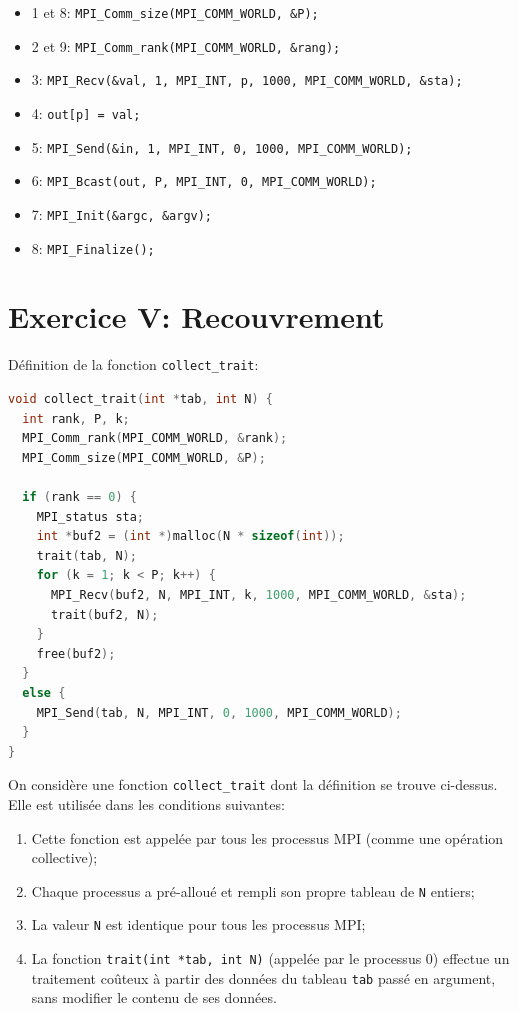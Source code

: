 \documentclass{article}
\begin{document}
\begin{itemize}
\item 1 et 8: \texttt{MPI\_Comm\_size(MPI\_COMM\_WORLD, \&P);}
\item 2 et 9: \texttt{MPI\_Comm\_rank(MPI\_COMM\_WORLD, \&rang);}
\item 3: \texttt{MPI\_Recv(\&val, 1, MPI\_INT, p, 1000, MPI\_COMM\_WORLD, \&sta);}
\item 4: \texttt{out[p] = val;}
\item 5: \texttt{MPI\_Send(\&in, 1, MPI\_INT, 0, 1000, MPI\_COMM\_WORLD);}
\item 6: \texttt{MPI\_Bcast(out, P, MPI\_INT, 0, MPI\_COMM\_WORLD);}
\item 7: \texttt{MPI\_Init(\&argc, \&argv);}
\item 8: \texttt{MPI\_Finalize();}
\end{itemize}

\newpage\section{Exercice V: Recouvrement}


\begin{blockquote}

Définition de la fonction \texttt{collect\_trait}:

\begin{lstlisting}[language=c]
void collect_trait(int *tab, int N) {
  int rank, P, k;
  MPI_Comm_rank(MPI_COMM_WORLD, &rank);
  MPI_Comm_size(MPI_COMM_WORLD, &P);

  if (rank == 0) {
    MPI_status sta;
    int *buf2 = (int *)malloc(N * sizeof(int));
    trait(tab, N);
    for (k = 1; k < P; k++) {
      MPI_Recv(buf2, N, MPI_INT, k, 1000, MPI_COMM_WORLD, &sta);
      trait(buf2, N);
    }
    free(buf2);
  }
  else {
    MPI_Send(tab, N, MPI_INT, 0, 1000, MPI_COMM_WORLD);
  }
}
\end{lstlisting}

On considère une fonction \texttt{collect\_trait} dont la définition se trouve ci-dessus. Elle est utilisée dans les conditions suivantes:

\begin{enumerate}
\item Cette fonction est appelée par tous les processus MPI (comme une opération collective);

\item Chaque processus a pré-alloué et rempli son propre tableau de \texttt{N} entiers;

\item La valeur \texttt{N} est identique pour tous les processus MPI;

\item La fonction \texttt{trait(int *tab, int N)} (appelée par le processus 0) effectue un traitement coûteux à partir des données du tableau \texttt{tab} passé en argument, sans modifier le contenu de ses données.

\end{enumerate}
\end{blockquote}
\end{document}
